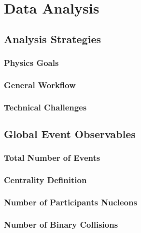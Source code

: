 \chapter{Data Analysis}

\section{Analysis Strategies}

\subsection{Physics Goals}

\subsection{General Workflow}

\subsection{Technical Challenges}

\section{Global Event Observables} 

\subsection{Total Number of Events}

\subsection{Centrality Definition}

\subsection{Number of Participants Nucleons}

\subsection{Number of Binary Collisions}

